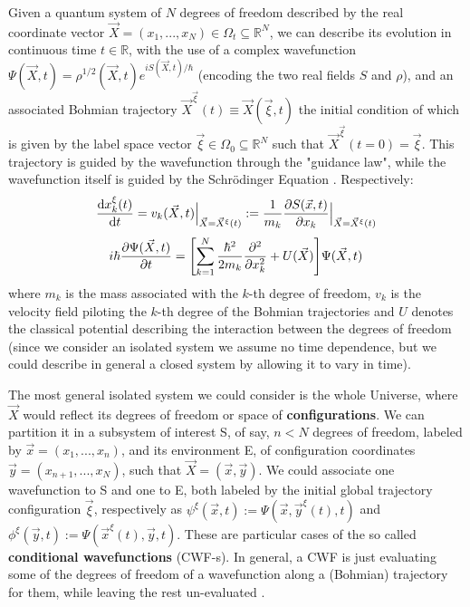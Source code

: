 \documentclass[11pt, a4paper]{article} %
\newcommand{\R}{\mathbb{R}} %
\begin{document}
Given a quantum system of $N$ degrees of freedom described by the real coordinate vector $\vec{X}=(x_1,...,x_N)\in\Omega_t\subseteq\R^N$, we can describe its evolution in continuous time $t\in\R$, with the use of a complex wavefunction $\Psi(\vec{X},t)=\rho^{1/2}(\vec{X},t)e^{iS(\vec{X},t)/\hbar}$ (encoding the two real fields $S$ and $\rho$), and an associated Bohmian trajectory $\vec{X}^{\vec{\xi}}(t)\equiv \vec{X}(\vec{\xi},t)$ the initial condition of which is given by the label space vector $\vec{\xi}\in\Omega_0\subseteq\R^N$ such that $\vec{X}^{\vec{\xi}}(t=0)=\vec{\xi}$. This trajectory is guided by the wavefunction through the "guidance law", while the wavefunction itself is guided by the Schrödinger Equation \cite{Bohm,Holland,Durr,JordiXavier}. Respectively:
\begin{equation}\label{GL}
\dv{x_k^\xi(t)}{t} = v_k(\vec{X},t)\Big\rvert_{\vec{X}=\vec{X}^\xi(t)}:=\frac{1}{m_k} \pdv{S(\vec{x},t)}{x_k}\Big\rvert_{\vec{X}=\vec{X}^\xi(t)}
\end{equation}
\begin{equation}\label{SE}
i\hbar\pdv{\Psi(\vec{X},t)}{t}=\qty[ \sum_{k=1}^N \frac{\hbar^2}{2m_k}\pdv[2]{}{x_k}+U(\vec{X})]\Psi(\vec{X},t)
\end{equation}
where $m_k$ is the mass associated with the $k$-th degree of freedom, $v_k$ is the velocity field piloting the $k$-th degree of the Bohmian trajectories and $U$ denotes the classical potential describing the interaction between the degrees of freedom (since we consider an isolated system we assume no time dependence, but we could describe in general a closed system by allowing it to vary in time).

The most general isolated system we could consider is the whole Universe, where $\vec{X}$ would reflect its degrees of freedom or space of {\bf configurations}. We can partition it in a subsystem of interest S, of say, $n<N$ degrees of freedom, labeled by $\vec{x}=(x_1,...,x_n)$, and its environment E, of configuration coordinates $\vec{y}=(x_{n+1},...,x_N)$, such that $\vec{X}=(\vec{x},\vec{y})$. We could associate one wavefunction to S and one to E, both labeled by the initial global trajectory configuration $\vec{\xi}$, respectively as $\psi^\xi(\vec{x},t):=\Psi(\vec{x},\vec{y}^\xi(t),t)$ and $\phi^\xi(\vec{y},t):=\Psi(\vec{x}^\xi(t),\vec{y},t)$. These are particular cases of the so called {\bf conditional wavefunctions} (CWF-s). In general, a CWF is just evaluating some of the degrees of freedom of a wavefunction along a (Bohmian) trajectory for them, while leaving the rest un-evaluated \cite{Absolute, JordiXavier}.
\end{document}
